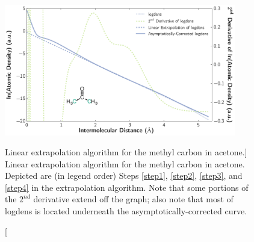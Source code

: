     \begin{figure}
    \includegraphics[width=0.9\textwidth]{workflow/acetone_extrapolation.pdf}
    \caption
        [Linear extrapolation algorithm for the methyl carbon in acetone.]
        {
        Linear extrapolation algorithm for the methyl carbon in acetone.
Depicted are (in legend order) Steps \ref{step1}, \ref{step2}, \ref{step3},
and \ref{step4} in the extrapolation algorithm. Note that some portions of the
$2^{nd}$ derivative extend off the graph; also note that most of logdens
is located underneath the asymptotically-corrected curve.
           		  }
    \label{fig:acetone-extrapolation}        
    \end{figure}



